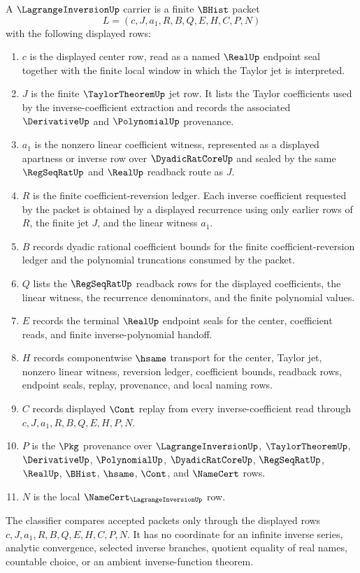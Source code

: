 \begin{definition}
\label{def:lagrange-inversion-carrier}
A $\LagrangeInversionUp$ carrier is a finite $\BHist$ packet
$$
L=(c,J,a_1,R,B,Q,E,H,C,P,N)
$$
with the following displayed rows:
\begin{enumerate}
\item $c$ is the displayed center row, read as a named $\RealUp$ endpoint seal together with the finite local window in which the Taylor jet is interpreted.
\item $J$ is the finite $\TaylorTheoremUp$ jet row. It lists the Taylor coefficients used by the inverse-coefficient extraction and records the associated $\DerivativeUp$ and $\PolynomialUp$ provenance.
\item $a_1$ is the nonzero linear coefficient witness, represented as a displayed apartness or inverse row over $\DyadicRatCoreUp$ and sealed by the same $\RegSeqRatUp$ and $\RealUp$ readback route as $J$.
\item $R$ is the finite coefficient-reversion ledger. Each inverse coefficient requested by the packet is obtained by a displayed recurrence using only earlier rows of $R$, the finite jet $J$, and the linear witness $a_1$.
\item $B$ records dyadic rational coefficient bounds for the finite coefficient-reversion ledger and the polynomial truncations consumed by the packet.
\item $Q$ lists the $\RegSeqRatUp$ readback rows for the displayed coefficients, the linear witness, the recurrence denominators, and the finite polynomial values.
\item $E$ records the terminal $\RealUp$ endpoint seals for the center, coefficient reads, and finite inverse-polynomial handoff.
\item $H$ records componentwise $\hsame$ transport for the center, Taylor jet, nonzero linear witness, reversion ledger, coefficient bounds, readback rows, endpoint seals, replay, provenance, and local naming rows.
\item $C$ records displayed $\Cont$ replay from every inverse-coefficient read through $c,J,a_1,R,B,Q,E,H,P,N$.
\item $P$ is the $\Pkg$ provenance over $\LagrangeInversionUp$, $\TaylorTheoremUp$, $\DerivativeUp$, $\PolynomialUp$, $\DyadicRatCoreUp$, $\RegSeqRatUp$, $\RealUp$, $\BHist$, $\hsame$, $\Cont$, and $\NameCert$ rows.
\item $N$ is the local $\NameCert_{\LagrangeInversionUp}$ row.
\end{enumerate}
The classifier compares accepted packets only through the displayed rows $c,J,a_1,R,B,Q,E,H,C,P,N$. It has no coordinate for an infinite inverse series, analytic convergence, selected inverse branches, quotient equality of real names, countable choice, or an ambient inverse-function theorem.
\end{definition}


